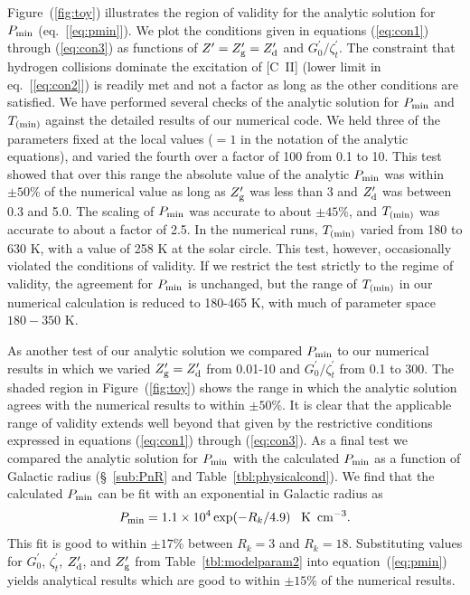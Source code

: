 \documentclass[12pt,preprint,flushrt]{aastex}
\newcommand{\beq}{\begin{equation}}
\newcommand{\eeq}{\end{equation}}
\newcommand{\pmin}{P_{\rm min}}
\newcommand{\tmin}{T_{\rm (min)}}
\newcommand{\gs}{G_{0}^\prime}
\newcommand{\zd}{Z_{\rm d}^\prime}
\newcommand{\zg}{Z_{\rm g}^\prime}
\newcommand{\zio}{\zeta_{t}^\prime}
\begin{document}
Figure~(\ref{fig:toy}) illustrates the region of validity for the analytic
solution for $\pmin$ (eq.\ [\ref{eq:pmin}]). We plot the
conditions given in equations
(\ref{eq:con1}) through (\ref{eq:con3}) as functions of $Z^\prime = \zg = \zd$
and $\gs/\zio$. The constraint that hydrogen collisions dominate the
excitation
of [C~II] (lower limit in eq.\ [\ref{eq:con2}]) is readily met and not
a factor as long as the other conditions are satisfied.
We have performed several checks of
the analytic solution for $\pmin$ and $\tmin$
against the detailed results of our numerical code. We held
three of the parameters fixed at the local values ($=1$ in the
notation of the analytic equations), and varied the fourth
over a factor of 100 from 0.1 to 10.
This test showed that over this range the absolute value
of the analytic $\pmin$ was within $\pm 50$\%  of the numerical value
as long as $\zg$ was less than 3 and $\zd$ was between 0.3 and 5.0.
The scaling
of $\pmin$ was accurate to about $\pm 45$\%, and $\tmin$ was
accurate to about a factor of 2.5. In the numerical runs, $\tmin$ 
varied from
180 to 630 K, with a value of 258 K at the solar circle.  
This test,
however, occasionally violated the conditions of validity.
If we restrict the test strictly to  the regime of validity,
the agreement for $\pmin$ is unchanged, but the
range of $\tmin$ in our numerical calculation is reduced to 180-465 K,
with much of parameter space $180-350$ K.

As another test of our analytic solution we compared $\pmin$
to our numerical results in which we varied
$\zg =\zd$ from 0.01-10 and $\gs/\zio$ from 0.1 to 300. The
shaded region in Figure~(\ref{fig:toy}) shows the range in
which the analytic solution agrees with the numerical results to within
$\pm 50$\%. It is clear that the applicable range of
validity extends well beyond that given by the restrictive
conditions expressed in equations (\ref{eq:con1}) through (\ref{eq:con3}).
As a final test we compared the analytic solution for $\pmin$ with the
calculated $\pmin$ as a function of Galactic radius (\S~\ref{sub:PnR}
and Table~\ref{tbl:physicalcond}). We find that the calculated $\pmin$ can be fit with an 
exponential in Galactic radius as
\beq
 P_{\rm min} = 1.1\times 10^{4} \exp(-R_k/4.9)\,\,\,\,\, {\rm K\,\,\, cm^{-3}}.
\eeq
This fit is good to within $\pm 17$\% between $R_k = 3$ and $R_k = 18$.
Substituting values for $\gs$, $\zio$, $\zd$, and $\zg$ from 
Table~\ref{tbl:modelparam2}
into equation~(\ref{eq:pmin}) yields analytical results which are good 
to within $\pm 15$\% of the numerical results.
\end{document}
